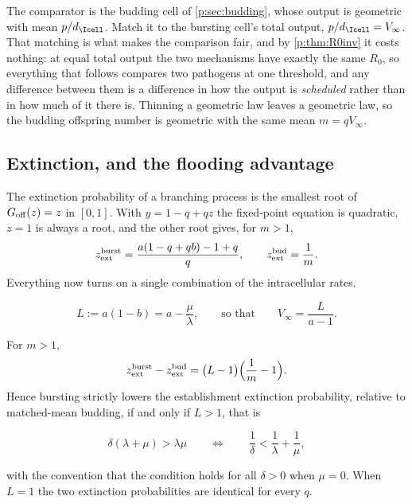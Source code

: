 The comparator is the budding cell of \cref{p:sec:budding}, whose output is
geometric with mean $p/d_{\Icell}$. Match it to the bursting cell's total
output, $p/d_{\Icell}=V_\infty$. That matching is what makes the comparison
fair, and by \cref{p:thm:R0inv} it costs nothing: at equal total output the
two mechanisms have exactly the same $R_0$, so everything that follows
compares two pathogens at one threshold, and any difference between them is
a difference in how the output is \emph{scheduled} rather than in how much of
it there is. Thinning a geometric law leaves a geometric law, so the budding
offspring number is geometric with the same mean $m=qV_\infty$.

\subsection{Extinction, and the flooding advantage}

The extinction probability of a branching process is the smallest root of
$G_{\rm off}(z)=z$ in $[0,1]$. With $y=1-q+qz$ the fixed-point equation is
quadratic, $z=1$ is always a root, and the other root gives, for $m>1$,
\begin{equation}
z_{\rm ext}^{\rm burst}
=\frac{a(1-q+qb)-1+q}{q},
\qquad
z_{\rm ext}^{\rm bud}=\frac{1}{m}.
\label{p:eq:zext}
\end{equation}
Everything now turns on a single combination of the intracellular rates.

\begin{definition}
\label{p:def:L}
\begin{equation}
L:=a(1-b)=a-\frac{\mu}{\lambda},
\qquad\text{so that}\qquad
V_\infty=\frac{L}{a-1}.
\label{p:eq:Ldef}
\end{equation}
\end{definition}

\begin{theorem}
\label{p:thm:flood}
For $m>1$,
\begin{equation}
z_{\rm ext}^{\rm burst}-z_{\rm ext}^{\rm bud}
=\bigl(L-1\bigr)\Bigl(\frac{1}{m}-1\Bigr).
\label{p:eq:flood}
\end{equation}
Hence bursting strictly lowers the establishment extinction probability,
relative to matched-mean budding, if and only if $L>1$, that is
\begin{keyresult}
\begin{equation}
\delta(\lambda+\mu)>\lambda\mu
\qquad\Longleftrightarrow\qquad
\frac{1}{\delta}<\frac{1}{\lambda}+\frac{1}{\mu},
\label{p:eq:floodcrit}
\end{equation}
\end{keyresult}
with the convention that the condition holds for all $\delta>0$ when
$\mu=0$. When $L=1$ the two extinction probabilities are identical for every
$q$.
\end{theorem}

